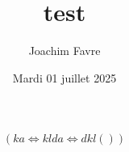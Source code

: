 \documentclass[a4paper]{article}
\title{test}
\author{Joachim Favre}
\date{Mardi 01 juillet 2025}
\begin{document}
\maketitle



\begin{align} 
\left(ka\iff klda\iff dkl\left(\right)\right)
\end{align}
\end{document}
